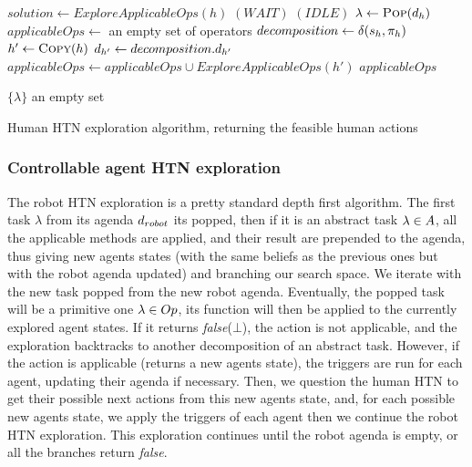 \documentclass[a4paper,11pt,twoside]{StyleThese}
\begin{document}
\begin{algorithm}[H]
\begin{algorithmic}[1]
\State $solution \leftarrow ExploreApplicableOps(h)$
	\Return $(WAIT)$
\EndIf
\EndFunction
\Statex
{}
	\Return $(IDLE)$
\EndIf
\State $\lambda \leftarrow \textsc{Pop}(d_h)$
	\State $applicableOps \leftarrow$ an empty set of operators
		\State $decomposition \leftarrow \delta(s_h, \pi_h)$
			\State $h' \leftarrow \textsc{Copy}(h)$
			\State $d_{h'} \leftarrow decomposition.d_{h'}$
			\State $applicableOps \leftarrow applicableOps \cup ExploreApplicableOps(h')$
		\EndIf
	\EndFor
	\State \Return $applicableOps$
\EndIf

		\State \Return $\{\lambda\}$
	\Else
		\State \Return an empty set
	\EndIf
\EndIf
\EndFunction
	
\end{algorithmic}
 \caption{Human HTN exploration algorithm, returning the feasible human actions}
 \label{alg:gethactions}
\end{algorithm}

\subsubsection{Controllable agent HTN exploration}
The robot HTN exploration is a pretty standard depth first algorithm. The first task $\lambda$ from its agenda $d_{robot}$ its popped, then if it is an abstract task $\lambda \in A$, all the applicable methods are applied, and their result are prepended to the agenda, thus giving new agents states (with the same beliefs as the previous ones but with the robot agenda updated) and branching our search space. We iterate with the new task popped from the new robot agenda. Eventually, the popped task will be a primitive one $\lambda \in Op$, its function will then be applied to the currently explored agent states. If it returns \textit{false}($\bot$), the action is not applicable, and the exploration backtracks to another decomposition of an abstract task. However, if the action is applicable (returns a new agents state), the triggers are run for each agent, updating their agenda if necessary. Then, we question the human HTN to get their possible next actions from this new agents state, and, for each possible new agents state, we apply the triggers of each agent then we continue the robot HTN exploration. This exploration continues until the robot agenda is empty, or all the branches return \textit{false}.
\end{document}
